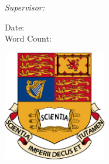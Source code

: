\begin{titlepage}
\begin{flushleft}
\vspace{5mm}

\textit{Supervisor:}\\
\hspace{2mm} \reportsupervisor
\end{flushleft}
\vspace{6mm}
\makeatletter
Date: \@date\\
Word Count: \wordcount

\vspace*{\fill} %
{
\begin{center}
	\vspace{1.5cm}
	\includegraphics[width = 4.5cm]{ICL-crest.pdf}\\
\end{center}

}
\vspace*{\fill} 
\clearpage %


\makeatother


\end{titlepage}


